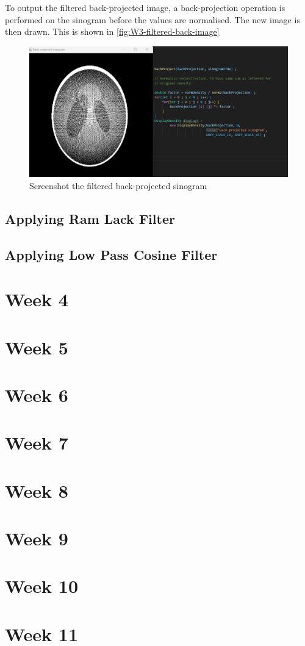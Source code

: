 To output the filtered back-projected image, a back-projection operation is performed on the sinogram before the values are normalised. The new image is then drawn. This is shown in \autoref{fig:W3-filtered-back-image}

\begin{figure}[H] 
    \centering
    \includegraphics[width=1\columnwidth]{Figures/Week 3/filtered-back-projection.png}
    \caption{Screenshot the filtered back-projected sinogram}
    \label{fig:W3-filtered-back-image}
\end{figure}


\subsection{Applying Ram Lack Filter}
\subsection{Applying Low Pass Cosine Filter}



\section{Week 4}
\section{Week 5}
\section{Week 6}
\section{Week 7}
\section{Week 8}
\section{Week 9}
\section{Week 10}
\section{Week 11}
